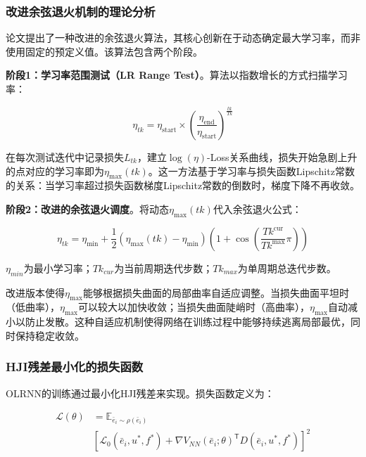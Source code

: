 \documentclass[10.5pt,a4paper,twoside,twocolumn]{ctexart}
\newcommand{\T}{\mathsf{T}}
\begin{document}
\subsubsection{\heiti{} 改进余弦退火机制的理论分析}

论文提出了一种改进的余弦退火算法，其核心创新在于动态确定最大学习率，而非使用固定的预定义值。该算法包含两个阶段。

\textbf{阶段1：学习率范围测试（LR Range Test）}。算法以指数增长的方式扫描学习率：

\begin{equation}
\eta_{tk} = \eta_{\text{start}} \times \left( \frac{\eta_{\text{end}}}{\eta_{\text{start}}} \right)^{\frac{tk}{Tk}}
\label{eq:lrscan}
\end{equation}

在每次测试迭代中记录损失$L_{tk}$，建立$\log(\eta)$-Loss关系曲线，损失开始急剧上升的点对应的学习率即为$\eta_{\max}(tk)$。这一方法基于学习率与损失函数Lipschitz常数的关系：当学习率超过损失函数梯度Lipschitz常数的倒数时，梯度下降不再收敛。

\textbf{阶段2：改进的余弦退火调度}。将动态$\eta_{\max}(tk)$代入余弦退火公式：

\begin{equation}
\eta_{tk} = \eta_{\min} + \frac{1}{2} (\eta_{\max}(tk) - \eta_{\min}) \left( 1 + \cos\left( \frac{Tk^{\text{cur}}}{Tk^{\max}} \pi \right) \right)
\label{eq:cosine}
\end{equation}

\(\eta_{min}\)为最小学习率；\(Tk_{cur}\)为当前周期迭代步数；\(Tk_{max}\)为单周期总迭代步数。

改进版本使得$\eta_{\max}$能够根据损失曲面的局部曲率自适应调整。当损失曲面平坦时（低曲率），$\eta_{\max}$可以较大以加快收敛；当损失曲面陡峭时（高曲率），$\eta_{\max}$自动减小以防止发散。这种自适应机制使得网络在训练过程中能够持续逃离局部最优，同时保持稳定收敛。

\subsubsection{\heiti{} HJI残差最小化的损失函数}

OLRNN的训练通过最小化HJI残差来实现。损失函数定义为：

\begin{equation}
	\begin{aligned}
	\mathcal{L}(\theta) & = \mathbb{E}_{\bar{e}_i \sim \rho(\bar{e}_i)} \\
	& \left[ \mathcal{L}_0(\bar{e}_i, u^*, f^*) + \nabla V_{NN}(\bar{e}_i; \theta)^{\T} D(\bar{e}_i, u^*, f^*) \right]^2
	\end{aligned}
	\label{eq:loss}
\end{equation}
\end{document}
